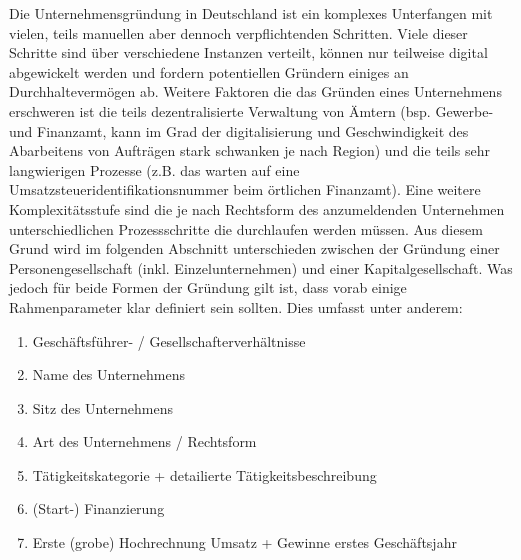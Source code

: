 Die Unternehmensgründung in Deutschland ist ein komplexes Unterfangen mit vielen, teils manuellen aber dennoch verpflichtenden Schritten. Viele dieser Schritte sind über verschiedene Instanzen verteilt, können nur teilweise digital abgewickelt werden und fordern potentiellen Gründern einiges an Durchhaltevermögen ab. Weitere Faktoren die das Gründen eines Unternehmens erschweren ist die teils dezentralisierte Verwaltung von Ämtern (bsp. Gewerbe- und Finanzamt, kann im Grad der digitalisierung und Geschwindigkeit des Abarbeitens von Aufträgen stark schwanken je nach Region) und die teils sehr langwierigen Prozesse (z.B. das warten auf eine Umsatzsteueridentifikationsnummer beim örtlichen Finanzamt). Eine weitere Komplexitätsstufe sind die je nach Rechtsform des anzumeldenden Unternehmen unterschiedlichen Prozessschritte die durchlaufen werden müssen. Aus diesem Grund wird im folgenden Abschnitt unterschieden zwischen der Gründung einer Personengesellschaft (inkl. Einzelunternehmen) und einer Kapitalgesellschaft. Was jedoch für beide Formen der Gründung gilt ist, dass vorab einige Rahmenparameter klar definiert sein sollten. Dies umfasst unter anderem:

\begin{enumerate}
    \item Geschäftsführer- / Gesellschafterverhältnisse
    \item Name des Unternehmens
    \item Sitz des Unternehmens
    \item Art des Unternehmens / Rechtsform
    \item Tätigkeitskategorie + detailierte Tätigkeitsbeschreibung
    \item (Start-) Finanzierung
    \item Erste (grobe) Hochrechnung Umsatz + Gewinne erstes Geschäftsjahr
\end{enumerate}

